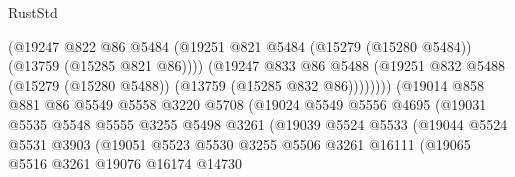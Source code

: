 \begin{lexlean}{RustStd}
\begin{coremodule}
                                      (@19247
                                        @822
                                        @86
                                        @5484
                                        (@19251
                                          @821
                                          @5484
                                          (@15279 (@15280 @5484))
                                          (@13759 (@15285 @821 @86))))
                                      (@19247
                                        @833
                                        @86
                                        @5488
                                        (@19251
                                          @832
                                          @5488
                                          (@15279 (@15280 @5488))
                                          (@13759 (@15285 @832 @86))))))))
                              (@19014
                                @858
                                @881
                                @86
                                @5549
                                @5558
                                @3220
                                @5708
                                (@19024
                                  @5549
                                  @5556
                                  @4695
                                  (@19031
                                    @5535
                                    @5548
                                    @5555
                                    @3255
                                    @5498
                                    @3261
                                    (@19039
                                      @5524
                                      @5533
                                      (@19044
                                        @5524
                                        @5531
                                        @3903
                                        (@19051
                                          @5523
                                          @5530
                                          @3255
                                          @5506
                                          @3261
                                          @16111
                                          (@19065
                                            @5516
                                            @3261
                                            @19076
                                            @16174
                                            @14730

\end{coremodule}
\end{lexlean}
